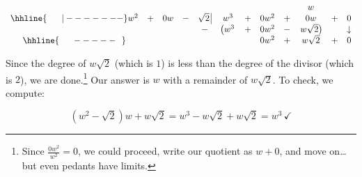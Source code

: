 {\begin{enumerate}
\setlength\arraycolsep{0.1pt}
\setlength\extrarowheight{2pt}

\[ \begin{array}{cccccccccccc}

    &   &    &   &                    &     &   &      &   &  w &   & \\ \hhline{~~~~~|-------}

w^2 & + & 0w & - & \sqrt{2} \, \vline & w^3 & + & 0w^2 & + & 0w & + & 0  \\
    
		&   &    &    &                  -&\left(w^3\vphantom{w\sqrt{2}} \right. & + & 0w^2 & - & \left.  w\sqrt{2} \right) & & \downarrow \\ \hhline{~~~~~-----~~}
    &   &    &    &                   &                                       &  &  0w^2     &  + &   w\sqrt{2}  & + & 0\\ 
 
\end{array}\]
\setlength\arraycolsep{5pt}
\setlength\extrarowheight{0pt}

Since the degree of $w\sqrt{2}$ (which is $1$) is less than the degree of the divisor (which is $2$), we are done.\footnote{Since $\frac{0w^2}{w^2} = 0$, we could proceed, write our quotient as $w+0$, and move on\ldots but even pedants have limits.}  Our answer is $w$ with a remainder of $w \sqrt{2}$.  To check, we compute:

\[ \left(w^2 - \sqrt{2}\right)w + w\sqrt{2} = w^3 - w\sqrt{2} + w\sqrt{2} = w^3 \, \checkmark\]

\end{enumerate}
}




